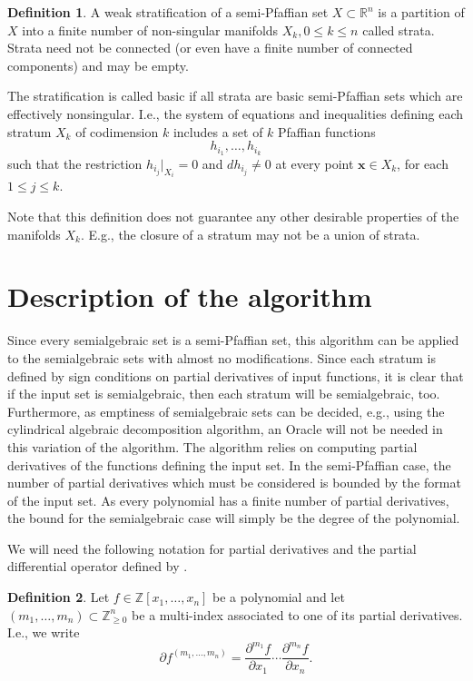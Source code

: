 \documentclass[
]{book}
\theoremstyle{definition}
\newtheorem{definition}{Definition}[chapter]
\theoremstyle{definition}
\theoremstyle{definition}
\theoremstyle{definition}
\theoremstyle{remark}
\begin{document}
\begin{definition}
\citep[Definition 6.2]{gv04}
A weak stratification of a semi-Pfaffian set \(X \subset \mathbb{R}^n\) is a partition of \(X\) into a finite number of non-singular manifolds \(X_k, 0 \le k \le n\) called strata. Strata need not be connected (or even have a finite number of connected components) and may be empty.

The stratification is called basic if all strata are basic semi-Pfaffian sets which are effectively nonsingular.
I.e., the system of equations and inequalities defining each stratum \(X_k\) of codimension \(k\) includes a set of \(k\) Pfaffian functions
\[
h_{i_1}, \ldots , h_{i_k}
\] such that the restriction \(h_{i_j}\vert_{X_i} = 0\) and \(d h_{i_j} \ne 0\) at every point \(\mathbf{x} \in X_k\), for each \(1 \le j \le k\).
\end{definition}

Note that this definition does not guarantee any other desirable properties of the manifolds \(X_k\). E.g., the closure of a stratum may not be a union of strata.

\hypertarget{sec:strat-alg-description}{%
\section{Description of the algorithm}\label{sec:strat-alg-description}}

Since every semialgebraic set is a semi-Pfaffian set, this algorithm can be applied to the semialgebraic sets with almost no modifications.
Since each stratum is defined by sign conditions on partial derivatives of input functions, it is clear that if the input set is semialgebraic, then each stratum will be semialgebraic, too. Furthermore, as emptiness of semialgebraic sets can be decided, e.g., using the cylindrical algebraic decomposition algorithm, an Oracle will not be needed in this variation of the algorithm.
The algorithm relies on computing partial derivatives of the functions defining the input set. In the semi-Pfaffian case, the number of partial derivatives which must be considered is bounded by the format of the input set. As every polynomial has a finite number of partial derivatives, the bound for the semialgebraic case will simply be the degree of the polynomial.

We will need the following notation for partial derivatives and the partial differential operator defined by \citet{gv1995}.

\begin{definition}
\protect\hypertarget{def:pdo}{}\label{def:pdo}\citep[Definition 2]{gv1995}
Let \(f \in \mathbb{Z}[x_1,\ldots,x_n]\) be a polynomial and let \((m_1,\ldots,m_n) \subset \mathbb{Z}_{\ge 0}^n\) be a multi-index associated to one of its partial derivatives.
I.e., we write
\[
\partial f^{(m_1,\ldots,m_n)} =
\dfrac{\partial^{m_1} f}{\partial x_1} \cdots \dfrac{\partial^{m_n} f}{\partial x_n}.
\]
\end{definition}
\end{document}
